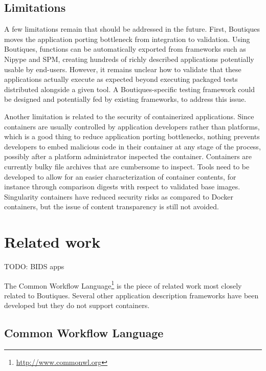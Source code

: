\documentclass{article}
\newcommand{\todo}[1]{\color{red}TODO: #1\color{black}}
\newcommand{\boutiques}{Boutiques\xspace}
\begin{document}
\subsection{Limitations}

A few limitations remain that should be addressed in the
future. First, \boutiques moves the application porting bottleneck
from integration to validation. Using \boutiques, functions can be
automatically exported from frameworks such as Nipype and SPM,
creating hundreds of richly described applications potentially usable
by end-users. However, it remains unclear how to validate that these
applications actually execute as expected beyond executing packaged tests
distributed alongside a given tool. A \boutiques-specific testing
framework could be designed and potentially fed by existing frameworks,
to address this issue.

Another limitation is related to the security of containerized
applications. Since containers are usually controlled by application
developers rather than platforms, which is a good thing to reduce
application porting bottlenecks, nothing prevents developers to embed
malicious code in their container at any stage of the process,
possibly after a platform administrator inspected the
container. Containers are currently bulky file archives that are
cumbersome to inspect. Tools need to be developed to allow for an
easier characterization of container contents, for instance through
comparison digests with respect to validated base images. Singularity
containers have reduced security risks as compared to Docker containers,
but the issue of content transparency is still not avoided.


\section{Related work}

\todo{BIDS apps}

The Common Workflow Language\footnote{\url{http://www.commonwl.org}}
is the piece of related work most closely related to
\boutiques. Several other application description frameworks have been
developed but they do not support containers.

\subsection{Common Workflow Language}
\end{document}
